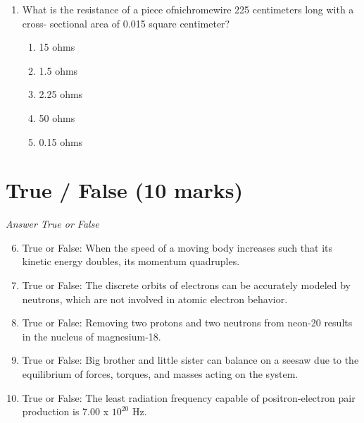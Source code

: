 \documentclass[12pt]{article}
\begin{document}
\begin{enumerate}[label=\arabic*.]
\begin{enumerate}[label=(\alph*)]
    \item It will quadruple.
    \item It will increase by a factor of 2.
    \item It will become zero.
    \item It will be halved.
    \item It will double.
\end{enumerate}
\item What is the resistance of a piece ofnichromewire 225 centimeters long with a cross- sectional area of 0.015 square centimeter?
\begin{enumerate}[label=(\alph*)]
    \item 15 ohms
    \item 1.5 ohms
    \item 2.25 ohms
    \item 50 ohms
    \item 0.15 ohms
\end{enumerate}
\end{enumerate}

\section*{True / False (10 marks)}
\textit{Answer True or False}
\begin{enumerate}[label=\arabic*.]
\setcounter{enumi}{5}
\item True or False: When the speed of a moving body increases such that its kinetic energy doubles, its momentum quadruples.
\item True or False: The discrete orbits of electrons can be accurately modeled by neutrons, which are not involved in atomic electron behavior.
\item True or False: Removing two protons and two neutrons from neon-20 results in the nucleus of magnesium-18.
\item True or False: Big brother and little sister can balance on a seesaw due to the equilibrium of forces, torques, and masses acting on the system.
\item True or False: The least radiation frequency capable of positron-electron pair production is 7.00 x $10^20$ Hz.
\end{enumerate}
\end{document}
